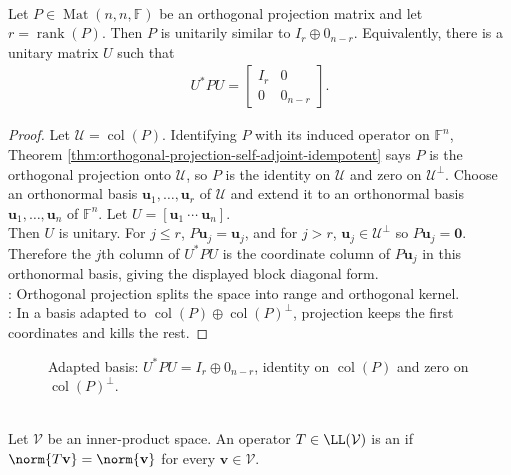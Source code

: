 \begin{theorem} \label{thm:orthogonal-projection-matrix-unitary-coordinate-form} \\
Let $P\in\operatorname{Mat}(n,n,\mathbb{F})$ be an orthogonal projection matrix and let $r=\operatorname{rank}(P)$. Then $P$ is unitarily similar to $I_r\oplus0_{n-r}$. Equivalently, there is a unitary matrix $U$ such that
\begin{align}
U^*PU=
\begin{bmatrix}
I_r & 0\\
0 & 0_{n-r}
\end{bmatrix}. \nonumber
\end{align}
\begin{proof}
Let $\mathcal{U}=\operatorname{col}(P)$. Identifying $P$ with its induced operator on $\mathbb{F}^n$, Theorem \ref{thm:orthogonal-projection-self-adjoint-idempotent} says $P$ is the orthogonal projection onto $\mathcal{U}$, so $P$ is the identity on $\mathcal{U}$ and zero on $\mathcal{U}^{\perp}$. Choose an orthonormal basis $\mathbf{u}_1,\ldots,\mathbf{u}_r$ of $\mathcal{U}$ and extend it to an orthonormal basis $\mathbf{u}_1,\ldots,\mathbf{u}_n$ of $\mathbb{F}^n$. Let $U=[\mathbf{u}_1\ \cdots\ \mathbf{u}_n]$.\\
Then $U$ is unitary. For $j\leq r$, $P\mathbf{u}_j=\mathbf{u}_j$, and for $j>r$, $\mathbf{u}_j\in\mathcal{U}^{\perp}$ so $P\mathbf{u}_j=\mathbf{0}$. Therefore the $j$th column of $U^*PU$ is the coordinate column of $P\mathbf{u}_j$ in this orthonormal basis, giving the displayed block diagonal form.\\
: Orthogonal projection splits the space into range and orthogonal kernel.\\
: In a basis adapted to $\operatorname{col}(P)\oplus\operatorname{col}(P)^{\perp}$, projection keeps the first coordinates and kills the rest.
\end{proof}
\end{theorem}

\begin{figure}[H]
  \centering
  
  \caption{Adapted basis: $U^*PU=I_r\oplus0_{n-r}$, identity on $\operatorname{col}(P)$ and zero on $\operatorname{col}(P)^\perp$.}
  \label{fig:orthogonal-projection-unitary-block}
\end{figure}

\begin{definition} \label{def:isometry-linear-map} \\
Let $\mathcal{V}$ be an inner-product space. An operator $T\in\LL(\mathcal{V})$ is an  if $\norm{T\mathbf{v}}=\norm{\mathbf{v}}$ for every $\mathbf{v}\in\mathcal{V}$.
\end{definition}

